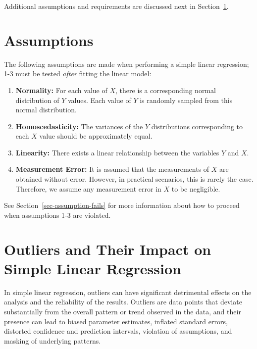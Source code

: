 \documentclass[
  letterpaper,
]{book}
\providecommand{\tightlist}{%
  \setlength{\itemsep}{0pt}\setlength{\parskip}{0pt}}\usepackage{longtable,booktabs,array}
\begin{document}
Additional assumptions and requirements are discussed next in
Section~\ref{sec-linear-model-assumptions}.

\section{Assumptions}\label{sec-linear-model-assumptions}

The following assumptions are made when performing a simple linear
regression; 1-3 must be tested \emph{after} fitting the linear model:

\begin{enumerate}
\def\labelenumi{\arabic{enumi}.}
\tightlist
\item
  \textbf{Normality:} For each value of \(X\), there is a corresponding
  normal distribution of \(Y\) values. Each value of \(Y\) is randomly
  sampled from this normal distribution.
\item
  \textbf{Homoscedasticity:} The variances of the \(Y\) distributions
  corresponding to each \(X\) value should be approximately equal.
\item
  \textbf{Linearity:} There exists a linear relationship between the
  variables \(Y\) and \(X\).
\item
  \textbf{Measurement Error:} It is assumed that the measurements of
  \(X\) are obtained without error. However, in practical scenarios,
  this is rarely the case. Therefore, we assume any measurement error in
  \(X\) to be negligible.
\end{enumerate}

See Section~\ref{sec-assumption-fails} for more information about how to
proceed when assumptions 1-3 are violated.

\section{Outliers and Their Impact on Simple Linear
Regression}\label{outliers-and-their-impact-on-simple-linear-regression}

In simple linear regression, outliers can have significant detrimental
effects on the analysis and the reliability of the results. Outliers are
data points that deviate substantially from the overall pattern or trend
observed in the data, and their presence can lead to biased parameter
estimates, inflated standard errors, distorted confidence and prediction
intervals, violation of assumptions, and masking of underlying patterns.
\end{document}
